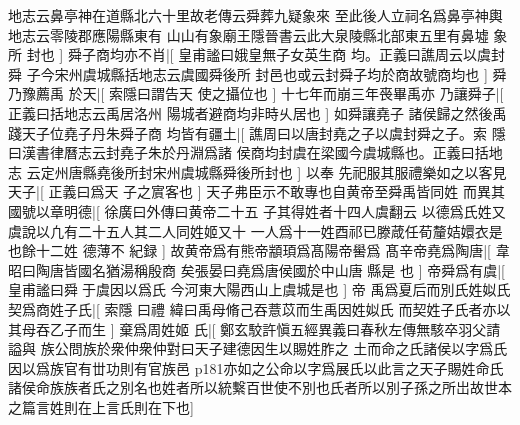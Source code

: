 地志云鼻亭神在道縣北六十里故老傳云舜葬九疑象來%
%
至此後人立祠名爲鼻亭神輿地志云零陵郡應陽縣東有%
山山有象廟王隱晉書云此大泉陵縣北部東五里有鼻墟%
%
象所%
封也%
]%
舜子商均亦不肖|[%
皇甫謐曰娥皇無子女英生商%
均。正義曰譙周云以虞封舜%
%
子今宋州虞城縣括地志云虞國舜後所%
封邑也或云封舜子均於商故號商均也%
]%
舜乃豫薦禹%
於天|[%
索隱曰謂告天%
使之攝位也%
]%
十七年而崩三年䘮畢禹亦%
乃讓舜子|[%
正義曰括地志云禹居洛州%
陽城者避商均非時乆居也%
]%
如舜讓堯子%
諸侯歸之然後禹踐天子位堯子丹朱舜子商%
均皆有疆土|[%
譙周曰以唐封堯之子以虞封舜之子。索%
隱曰漢書律曆志云封堯子朱於丹淵爲諸%
%
侯商均封虞在梁國今虞城縣也。正義曰括地志%
云定州唐縣堯後所封宋州虞城縣舜後所封也%
]%
以奉%
先祀服其服禮樂如之以客見天子|[%
正義曰爲天%
子之賔客也%
]%
天子弗臣示不敢專也自黄帝至舜禹皆同姓%
而異其國號以章明德|[%
徐廣曰外傳曰黄帝二十五%
子其得姓者十四人虞翻云%
%
以德爲氏姓又虞說以凢有二十五人其二人同姓姬又十%
一人爲十一姓酉祁已滕葴任荀釐姞嬛衣是也餘十二姓%
%
德薄不%
紀録%
]%
故黄帝爲有熊帝顓頊爲髙陽帝嚳爲%
髙辛帝堯爲陶唐|[%
韋昭曰陶唐皆國名猶湯稱殷商%
矣張晏曰堯爲唐侯國於中山唐%
%
縣是%
也%
]%
帝舜爲有虞|[%
皇甫謐曰舜𡣕于虞因以爲氏%
今河東大陽西山上虞城是也%
]%
帝%
禹爲夏后而別氏姓姒氏契爲商姓子氏|[%
索隱%
曰禮%
%
緯曰禹母脩己吞薏苡而生禹因姓姒氏%
而契姓子氏者亦以其母吞乙子而生%
]%
棄爲周姓姬%
氏|[%
鄭玄駮許愼五經異義曰春秋左傳無駭卒羽父請謚與%
族公問族於衆仲衆仲對曰天子建德因生以賜姓胙之%
%
土而命之氏諸侯以字爲氏因以爲族官有丗功則有官族邑%
p181亦如之公命以字爲展氏以此言之天子賜姓命氏諸侯命族族者氏之別名也姓者所以統繫百世使不別也氏者所以別子孫之所岀故世本之篇言姓則在上言氏則在下也]
